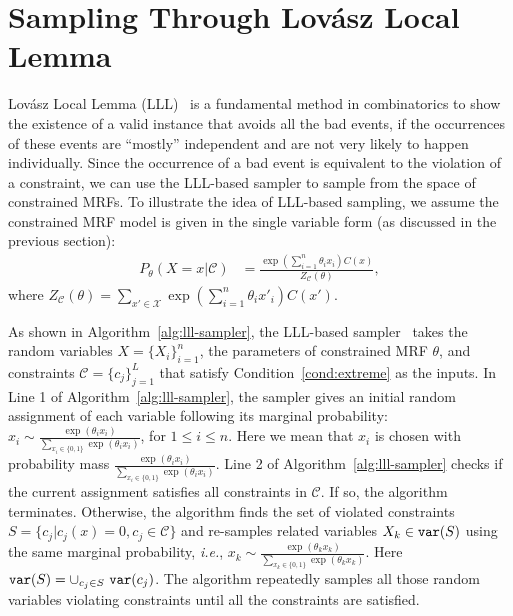 \section{Sampling Through Lov\'asz Local Lemma}
Lov\'asz Local Lemma (LLL)~\citep{erdHos1973problems} is a fundamental method
in combinatorics to show the existence of a valid instance that avoids all the
bad events, if the occurrences of these events are ``mostly'' independent and
are not very likely to happen individually.
%
Since the occurrence of a bad event is equivalent to the violation of a
constraint, we can use the LLL-based sampler to sample from the space of
constrained MRFs. To illustrate the idea of LLL-based sampling, we assume the
constrained MRF model is given in the single variable form (as discussed in the
previous section):
\begin{equation}  \label{eq:constr_mrf_single}
    \begin{aligned}
        P_{\theta}(X=x|\mathcal{C}) & =\frac{\exp \left(\sum_{i=1}^n \theta_i x_{i}\right)C(x)}{Z_\mathcal{C}(\theta)},
    \end{aligned}
\end{equation}
where $Z_\mathcal{C}(\theta)=\sum_{x'\in \mathcal{X}} \exp\left(\sum_{i=1}^n \theta_i x'_{i}\right) C(x')$.

As shown in Algorithm~\ref{alg:lll-sampler}, the LLL-based
sampler~\citep{DBLP:journals/jacm/GuoJL19} takes the random variables
$X=\{X_{i}\}_{i=1}^n$, the parameters of constrained MRF $\theta$, and
constraints $\mathcal{C}=\{c_j\}_{j=1}^L$ that satisfy
Condition~\ref{cond:extreme} as the inputs.
%
In Line 1 of Algorithm~\ref{alg:lll-sampler}, the sampler gives an initial
random assignment of each variable following its marginal probability: $x_i\sim
    \frac{\exp(\theta_i x_i)}{\sum_{x_i\in \{0,1\}}\exp(\theta_i x_i)}$, for $1\le
    i\le n$.
%
Here we mean that $x_i$ is chosen with probability mass $\frac{\exp(\theta_i
        x_i)}{\sum_{x_i\in \{0,1\}}\exp(\theta_i x_i)}$.
%
Line 2 of Algorithm~\ref{alg:lll-sampler} checks if the current assignment
satisfies all constraints in $\mathcal{C}$.
%
If so, the algorithm terminates. Otherwise, the algorithm finds the set of
violated constraints $S=\{c_j|c_j(x)=0,c_j \in\mathcal{C}\}$ and re-samples
related variables $X_k\in\mathtt{var}(S)$ using the same marginal probability,
\textit{i.e.}, $x_k\sim \frac{\exp(\theta_k x_k)}{\sum_{x_k\in
            \{0,1\}}\exp(\theta_kx_k)}$. Here $\mathtt{var}(S)=\cup_{c_j\in S}~\mathtt{var}(c_j)$.
%
The algorithm repeatedly samples all those random variables violating
constraints until all the constraints are satisfied.

